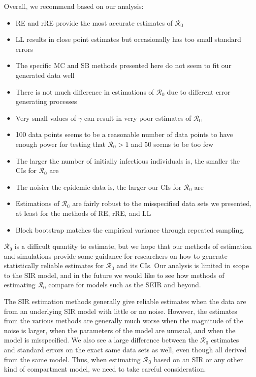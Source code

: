 \documentclass[12pt]{article}
\newcommand{\rr}{\ensuremath{\mathcal{R}_0}}
\begin{document}
Overall, we recommend based on our analysis:
\begin{itemize}
  \item RE and rRE provide the most accurate estimates of $\rr$
  \item LL results in close point estimates but occasionally has too small standard errors
  \item The specific MC and SB methods presented here do not seem to fit our generated data well
  \item There is not much difference in estimations of $\rr$ due to different error generating processes
  \item Very small values of $\gamma$ can result in very poor estimates of $\rr$
  \item 100 data points seems to be a reasonable number of data points to have enough power for testing that $\rr > 1$ and 50 seems to be too few
  \item The larger the number of initially infectious individuals is, the smaller the CIs for $\rr$ are
  \item The noisier the epidemic data is, the larger our CIs for $\rr$ are
  \item Estimations of $\rr$ are fairly robust to the misspecified data sets we presented, at least for the methods of RE, rRE, and LL
  \item Block bootstrap matches the empirical variance through repeated sampling.
  \end{itemize}

$\rr$ is a difficult quantity to estimate, but we hope that our methods of estimation and simulations provide some guidance for researchers on how to generate statistically reliable estimates for $\rr$ and its CIs.  Our analysis is limited in scope to the SIR model, and in the future we would like to see how methods of estimating $\rr$ compare for models such as the SEIR and beyond.






The SIR estimation methods generally give reliable estimates when the data are from an underlying SIR model with little or no noise. However, the estimates from the various methods are generally much worse when the magnitude of the noise is larger, when the parameters of the model are unusual, and when the model is misspecified. We also see a large difference between the $\rr$ estimates and standard errors on the exact same data sets as well, even though all derived from the same model. Thus, when estimating $\rr$ based on an SIR or any other kind of compartment model, we need to take careful consideration.
\end{document}
